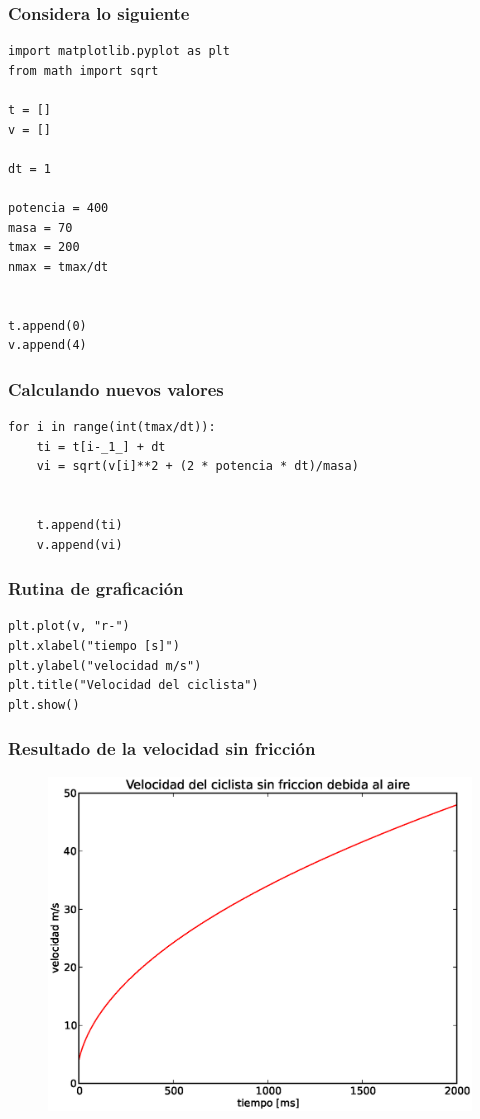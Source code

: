 \begin{frame}
\frametitle{Considera lo siguiente}
\begin{lstlisting}[caption=Información inicial del problema, style=FormattedNumber, basicstyle=\linespread{1.2}\ttfamily=\small, columns=fullflexible]
import matplotlib.pyplot as plt
from math import sqrt

t = []
v = []

dt = 1

potencia = 400
masa = 70
tmax = 200
nmax = tmax/dt


t.append(0)
v.append(4)
\end{lstlisting}
\end{frame}
\begin{frame}[fragile]
\frametitle{Calculando nuevos valores}
\begin{lstlisting}[caption=Ciclo para los nuevos valores de velocidad, style=FormattedNumber,basicstyle=\linespread{1.1}\ttfamily=\small, columns=fullflexible]
for i in range(int(tmax/dt)):
    ti = t[i-_1_] + dt
    vi = sqrt(v[i]**2 + (2 * potencia * dt)/masa)
    
    
    t.append(ti)
    v.append(vi)
\end{lstlisting}
\end{frame}
\begin{frame}[fragile]
\frametitle{Rutina de graficación}
\begin{lstlisting}[caption=Rutina para graficar los resultados, style=FormattedNumber,basicstyle=\linespread{1.2}\ttfamily=\small, columns=fullflexible]
plt.plot(v, "r-")
plt.xlabel("tiempo [s]")
plt.ylabel("velocidad m/s")
plt.title("Velocidad del ciclista")
plt.show()
\end{lstlisting}
\end{frame}
\begin{frame}
\frametitle{Resultado de la velocidad sin fricción}
\begin{figure}
	\centering
	\includegraphics[scale=0.5]{EjerBicicleta01.eps}
\end{figure}
\end{frame}
